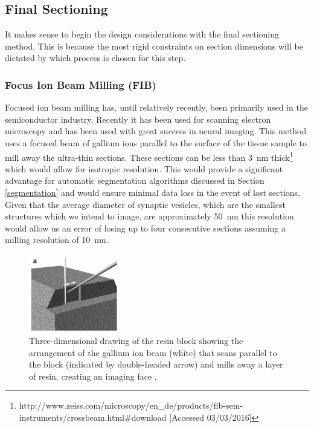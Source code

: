 \documentclass[a4paper, 11pt]{article}
\numberwithin{equation}{section}
\begin{document}
	
	\subsection{Final Sectioning}
	It makes sense to begin the design considerations with the final sectioning method. This is because the most rigid constraints on section dimensions will be dictated by which process is chosen for this step.
	\subsubsection{Focus Ion Beam Milling (FIB)}
	\label{sectioning_smallest_FIB}
	Focused ion beam milling has, until relatively recently, been primarily used in the semiconductor industry. Recently it has been used for scanning electron microscopy and has been used with great success in neural imaging\cite{knott2008serial}\cite{lich2016automated}. This method uses a focused beam of gallium ions parallel to the surface of the tissue sample to mill away the ultra-thin sections. These sections can be less than \SI{3}{\nano\metre} thick\footnote{http://www.zeiss.com/microscopy/en\_de/products/fib-sem-instruments/crossbeam.html\#download [Accessed 03/03/2016]} which would allow for isotropic resolution. This would provide a significant advantage for automatic segmentation algorithms discussed in Section \ref{segmentation} and would ensure minimal data loss in the event of lost sections. Given that the average diameter of synaptic vesicles, which are the smallest structures which we intend to image, are approximately \SI{50}{\nano\metre}\cite{purves2001release} this resolution would allow us an error of losing up to four consecutive sections assuming a milling resolution of \SI{10}{\nano\metre}.
	
	\begin{figure}
		\centering
		\includegraphics[width = 0.35\textwidth]{FIB_milling}
		\caption{Three-dimensional drawing of the resin block showing the arrangement of the gallium ion beam (white) that scans parallel to the block (indicated by double-headed arrow) and mills away a layer of resin, creating an imaging face \cite{knott2008serial}.}
		\label{FIB_milling}
	\end{figure}
	
\end{document}
